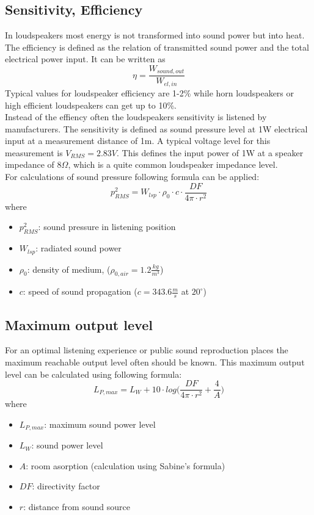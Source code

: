 \documentclass{article}
\begin{document}
\subsection{Sensitivity, Efficiency}
In loudspeakers most energy is not transformed into sound power but into heat. The efficiency is defined as the relation of transmitted sound power and the total electrical power input. It can be written as
\begin{equation}
\eta=\frac{W_{sound,out}}{W_{el,in}}
\end{equation}
Typical values for loudspeaker efficiency are 1-2\% while horn loudspeakers or high efficient loudspeakers can get up to 10\%.\\
Instead of the effiency often the loudspeakers sensitivity is listened by manufacturers. The sensitivity is defined as sound pressure level at 1W electrical input at a measurement distance of 1m. A typical voltage level for this measurement is $V_{RMS}=2.83V$. This defines the input power of 1W at a speaker impedance of $8\Omega$, which is a quite common loudspeaker impedance level. \\
For calculations of sound pressure following formula can be applied:
\begin{equation}
p_{RMS}^2=W_{lsp}\cdot \rho_0\cdot c\cdot\frac{DF}{4\pi\cdot r^2}
\end{equation}
where
\begin{itemize}
\item $p_{RMS}^2$: sound pressure in listening position
\item $W_{lsp}$: radiated sound power
\item $\rho_0$: density of medium, ($\rho_{0,air}=1.2\frac{kg}{m^3}$)
\item $c$: speed of sound propagation ($c=343.6\frac{m}{s}$ at $20^\circ$)
\end{itemize}
\subsection{Maximum output level}
For an optimal listening experience or public sound reproduction places the maximum reachable output level often should be known. This maximum output level can be calculated using following formula:
\begin{equation}
L_{P,max}=L_W+10\cdot log\bigg(\frac{DF}{4\pi\cdot r^2}+\frac{4}{A}\bigg)
\end{equation}
where
\begin{itemize}
\item $L_{P,max}$: maximum sound power level
\item $L_W$: sound power level
\item $A$: room asorption (calculation using Sabine's formula)
\item $DF$: directivity factor
\item $r$: distance from sound source
\end{itemize}
\end{document}
